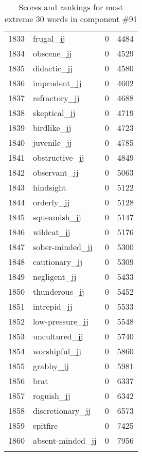 \begin{longtable}[!htbp]{| rlr@{.}l |}
    1833 & frugal\_jj & 0 & 4484 \\
    1834 & obscene\_jj & 0 & 4529 \\
    1835 & didactic\_jj & 0 & 4580 \\
    1836 & imprudent\_jj & 0 & 4602 \\
    1837 & refractory\_jj & 0 & 4688 \\
    1838 & skeptical\_jj & 0 & 4719 \\
    1839 & birdlike\_jj & 0 & 4723 \\
    1840 & juvenile\_jj & 0 & 4785 \\
    1841 & obstructive\_jj & 0 & 4849 \\
    1842 & observant\_jj & 0 & 5063 \\
    1843 & hindsight & 0 & 5122 \\
    1844 & orderly\_jj & 0 & 5128 \\
    1845 & squeamish\_jj & 0 & 5147 \\
    1846 & wildcat\_jj & 0 & 5176 \\
    1847 & sober-minded\_jj & 0 & 5300 \\
    1848 & cautionary\_jj & 0 & 5309 \\
    1849 & negligent\_jj & 0 & 5433 \\
    1850 & thunderous\_jj & 0 & 5452 \\
    1851 & intrepid\_jj & 0 & 5533 \\
    1852 & low-pressure\_jj & 0 & 5548 \\
    1853 & uncultured\_jj & 0 & 5740 \\
    1854 & worshipful\_jj & 0 & 5860 \\
    1855 & grabby\_jj & 0 & 5981 \\
    1856 & brat & 0 & 6337 \\
    1857 & roguish\_jj & 0 & 6342 \\
    1858 & discretionary\_jj & 0 & 6573 \\
    1859 & spitfire & 0 & 7425 \\
    1860 & absent-minded\_jj & 0 & 7956 \\
    \hline
    \caption{Scores and rankings for most extreme 30 words in component \#91} \\
\end{longtable}
